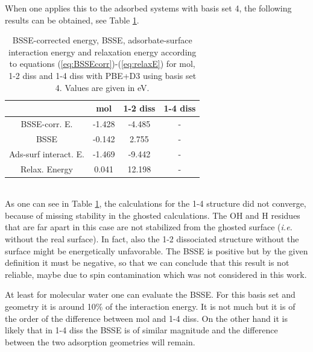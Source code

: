 \documentclass[11pt,DIV=13,BCOR=5mm,a4paper,headinclude]{scrbook}
\begin{document}
When one applies this to the adsorbed systems with basis set 4, the following results can be obtained, see Table \ref{tab:bsse-results}.
\begin{table}[!h]
  \centering
   \caption{BSSE-corrected energy, BSSE, adsorbate-surface interaction energy and relaxation energy according to equations (\ref{eq:BSSEcorr})-(\ref{eq:relaxE}) for mol, 1-2 diss and 1-4 diss with PBE+D3 using basis set 4.
Values are given in eV.}
  \begin{tabular}{c|ccc}
  \toprule
			& mol  & 1-2 diss & 1-4 diss \\\midrule
  BSSE-corr. E.		&-1.428 &-4.485 & -\\
  BSSE			&-0.142&2.755 & -\\
  Ads-surf interact. E.	&-1.469 &-9.442 & -\\
  Relax. Energy		&0.041 &12.198 & -\\\bottomrule
  \end{tabular}
  \label{tab:bsse-results}
 \end{table}
 \\
 
As one can see in Table \ref{tab:bsse-results}, the calculations for the 1-4 structure did not converge, because of missing stability in the ghosted calculations.
The OH and H residues that are far apart in this case are not stabilized from the ghosted surface (\textit{i.e.} without the real surface).
In fact, also the 1-2 dissociated structure without the surface might be energetically unfavorable.
The BSSE is positive but by the given definition it must be negative, so that we can conclude that this result is not reliable, maybe due to spin contamination which was not considered in this work.


At least for molecular water one can evaluate the BSSE.
For this basis set and geometry it is around 10$\%$ of the interaction
energy.
It is not much but it is of the order of the difference between mol and 1-4 diss.
On the other hand it is likely that in 1-4 diss the BSSE is of similar magnitude and the difference between the two adsorption geometries will remain.
\end{document}

